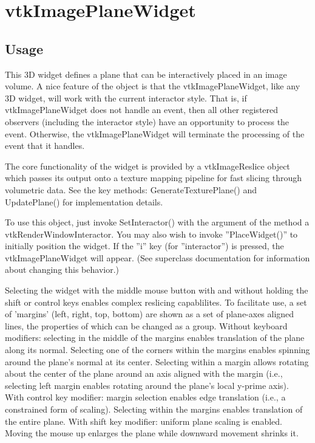 \section{vtkImagePlaneWidget}

\subsection{Usage}

 This 3D widget defines a plane that can be interactively placed in an
 image volume. A nice feature of the object is that the
 vtkImagePlaneWidget, like any 3D widget, will work with the current
 interactor style. That is, if vtkImagePlaneWidget does not handle an
 event, then all other registered observers (including the interactor
 style) have an opportunity to process the event. Otherwise, the
 vtkImagePlaneWidget will terminate the processing of the event that it
 handles.

 The core functionality of the widget is provided by a vtkImageReslice
 object which passes its output onto a texture mapping pipeline for fast
 slicing through volumetric data. See the key methods: GenerateTexturePlane()
 and UpdatePlane() for implementation details.

 To use this object, just invoke SetInteractor() with the argument of the
 method a vtkRenderWindowInteractor.  You may also wish to invoke
 ''PlaceWidget()'' to initially position the widget. If the ''i'' key (for
 ''interactor'') is pressed, the vtkImagePlaneWidget will appear. (See
 superclass documentation for information about changing this behavior.)

 Selecting the widget with the middle mouse button with and without holding
 the shift or control keys enables complex reslicing capablilites.
 To facilitate use, a set of 'margins' (left, right, top, bottom) are shown as
 a set of plane-axes aligned lines, the properties of which can be changed
 as a group.
 Without keyboard modifiers: selecting in the middle of the margins
 enables translation of the plane along its normal. Selecting one of the
 corners within the margins enables spinning around the plane's normal at its
 center.  Selecting within a margin allows rotating about the center of the
 plane around an axis aligned with the margin (i.e., selecting left margin
 enables rotating around the plane's local y-prime axis).
 With control key modifier: margin selection enables edge translation (i.e., a
 constrained form of scaling). Selecting within the margins enables
 translation of the entire plane.
 With shift key modifier: uniform plane scaling is enabled.  Moving the mouse
 up enlarges the plane while downward movement shrinks it.

